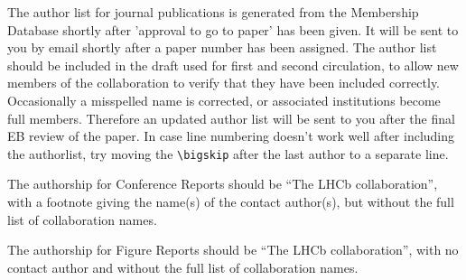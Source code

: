 \documentclass[12pt,a4paper]{article}
\begin{document}
\renewcommand{\thefootnote}{\fnsymbol{footnote}}
\setcounter{footnote}{1}

%
%
%
%


\renewcommand{\thefootnote}{\arabic{footnote}}
\setcounter{footnote}{0}

\cleardoublepage



\pagestyle{plain} %
\setcounter{page}{1}

\linenumbers




%









 
 
\newpage


The author list for journal publications is generated from the
Membership Database shortly after 'approval to go to paper' has been
given.  It will be sent to you by email shortly after a paper number
has been assigned.  The author list should be included in the draft used for 
first and second circulation, to allow new members of the collaboration to verify
that they have been included correctly. Occasionally a misspelled
name is corrected, or associated institutions become full members.
Therefore an updated author list will be sent to you after the final
EB review of the paper.  In case line numbering doesn't work well
after including the authorlist, try moving the \verb!\bigskip! after
the last author to a separate line.


The authorship for Conference Reports should be ``The LHCb
collaboration'', with a footnote giving the name(s) of the contact
author(s), but without the full list of collaboration names.


The authorship for Figure Reports should be ``The LHCb
collaboration'', with no contact author and without the full list 
of collaboration names.
\end{document}

